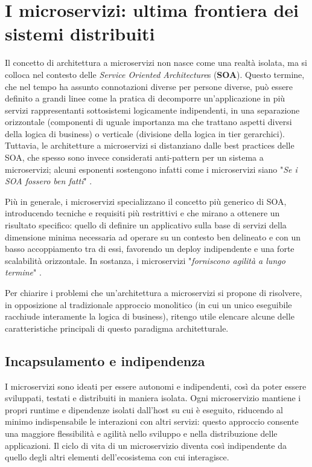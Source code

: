 \section{I microservizi: ultima frontiera dei sistemi distribuiti}
Il concetto di architettura a microservizi non nasce come una realtà isolata, ma si colloca nel contesto delle \emph{Service Oriented Architecture}s (\textbf{SOA}). Questo termine, che nel tempo ha assunto connotazioni diverse per persone diverse, può essere definito a grandi linee come la pratica di decomporre un'applicazione in più servizi rappresentanti sottosistemi logicamente indipendenti, in una separazione orizzontale (componenti di uguale importanza ma che trattano aspetti diversi della logica di business) o verticale (divisione della logica in tier gerarchici).
Tuttavia, le architetture a microservizi si distanziano dalle best practices delle SOA, che spesso sono invece considerati anti-pattern per un sistema a microservizi; alcuni esponenti sostengono infatti come i microservizi siano "\emph{Se i SOA fossero ben fatti}" \cite[25]{.NET_Microservices}.

Più in generale, i microservizi specializzano il concetto più generico di SOA, introducendo tecniche e requisiti più restrittivi e che mirano a ottenere un risultato specifico: quello di definire un applicativo sulla base di servizi della dimensione minima necessaria ad operare su un contesto ben delineato e con un basso accoppiamento tra di essi, favorendo un deploy indipendente e una forte scalabilità orizzontale. In sostanza, i microservizi "\emph{forniscono agilità a lungo termine}" \cite[25]{.NET_Microservices}.

Per chiarire i problemi che un'architettura a microservizi si propone di risolvere, in opposizione al tradizionale approccio monolitico (in cui un unico eseguibile racchiude interamente la logica di business), ritengo utile elencare alcune delle caratteristiche principali di questo paradigma architetturale.

\subsection{Incapsulamento e indipendenza}
I microservizi sono ideati per essere autonomi e indipendenti, così da poter essere sviluppati, testati e distribuiti in maniera isolata. Ogni microservizio mantiene i propri runtime e dipendenze isolati dall'host su cui è eseguito, riducendo al minimo indispensabile le interazioni con altri servizi: questo approccio consente una maggiore flessibilità e agilità nello sviluppo e nella distribuzione delle applicazioni. Il ciclo di vita di un microservizio diventa così indipendente da quello degli altri elementi dell'ecosistema con cui interagisce.

